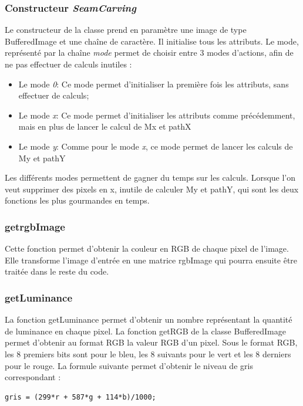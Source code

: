 \documentclass[12pt]{article}
\begin{document}
\subsubsection{Constructeur \textit{SeamCarving}}
Le constructeur de la classe prend en paramètre une image de type BufferedImage et une chaîne de caractère. Il initialise tous les attributs. Le mode, représenté par la chaîne \textit{mode} permet de choisir entre 3 modes d'actions, afin de ne pas effectuer de calculs inutiles :
\begin{itemize}
    \item Le mode \textit{0}:
    Ce mode permet d'initialiser la première fois les attributs, sans effectuer de calculs;

    \item Le mode \textit{x}:
    Ce mode permet d'initialiser les attributs comme précédemment, mais en plus de lancer le calcul de Mx et pathX

    \item Le mode \textit{y}:
    Comme pour le mode \textit{x}, ce mode permet de lancer les calculs de My et pathY
\end{itemize}

Les différents modes permettent de gagner du temps sur les calculs. Lorsque l'on veut supprimer des pixels en x, inutile de calculer My et pathY, qui sont les deux fonctions les plus gourmandes en temps.

\subsubsection{getrgbImage}
Cette fonction permet d'obtenir la couleur en RGB de chaque pixel de l'image.
Elle transforme l'image d'entrée en une matrice rgbImage qui pourra ensuite être traitée dans le reste du code.

\subsubsection{getLuminance}
La fonction getLuminance permet d'obtenir un nombre représentant la quantité de luminance en chaque pixel. La fonction getRGB de la classe BufferedImage permet d'obtenir au format RGB la valeur RGB d'un pixel. Sous le format RGB, les 8 premiers bits sont pour le bleu, les 8 suivants pour le vert et les 8 derniers pour le rouge. \newline La formule suivante permet d'obtenir le niveau de gris correspondant :
\begin{lstlisting}
gris = (299*r + 587*g + 114*b)/1000;
\end{lstlisting}
\end{document}
